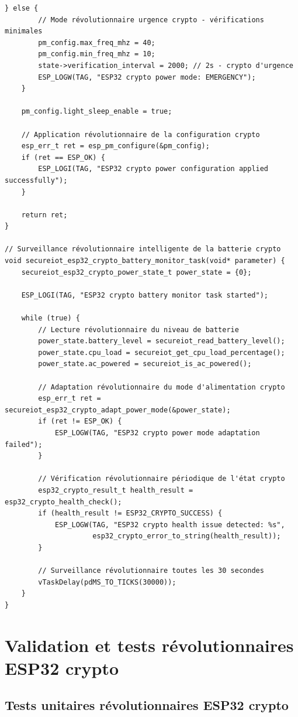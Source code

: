 \begin{lstlisting}[caption={Gestion révolutionnaire énergétique intelligente ESP32 crypto}]
    } else {
        // Mode révolutionnaire urgence crypto - vérifications minimales
        pm_config.max_freq_mhz = 40;
        pm_config.min_freq_mhz = 10;
        state->verification_interval = 2000; // 2s - crypto d'urgence
        ESP_LOGW(TAG, "ESP32 crypto power mode: EMERGENCY");
    }
    
    pm_config.light_sleep_enable = true;
    
    // Application révolutionnaire de la configuration crypto
    esp_err_t ret = esp_pm_configure(&pm_config);
    if (ret == ESP_OK) {
        ESP_LOGI(TAG, "ESP32 crypto power configuration applied successfully");
    }
    
    return ret;
}

// Surveillance révolutionnaire intelligente de la batterie crypto
void secureiot_esp32_crypto_battery_monitor_task(void* parameter) {
    secureiot_esp32_crypto_power_state_t power_state = {0};
    
    ESP_LOGI(TAG, "ESP32 crypto battery monitor task started");
    
    while (true) {
        // Lecture révolutionnaire du niveau de batterie
        power_state.battery_level = secureiot_read_battery_level();
        power_state.cpu_load = secureiot_get_cpu_load_percentage();
        power_state.ac_powered = secureiot_is_ac_powered();
        
        // Adaptation révolutionnaire du mode d'alimentation crypto
        esp_err_t ret = secureiot_esp32_crypto_adapt_power_mode(&power_state);
        if (ret != ESP_OK) {
            ESP_LOGW(TAG, "ESP32 crypto power mode adaptation failed");
        }
        
        // Vérification révolutionnaire périodique de l'état crypto
        esp32_crypto_result_t health_result = esp32_crypto_health_check();
        if (health_result != ESP32_CRYPTO_SUCCESS) {
            ESP_LOGW(TAG, "ESP32 crypto health issue detected: %s", 
                     esp32_crypto_error_to_string(health_result));
        }
        
        // Surveillance révolutionnaire toutes les 30 secondes
        vTaskDelay(pdMS_TO_TICKS(30000));
    }
}
\end{lstlisting}

\section{Validation et tests révolutionnaires ESP32 crypto}

\subsection{Tests unitaires révolutionnaires ESP32 crypto}

